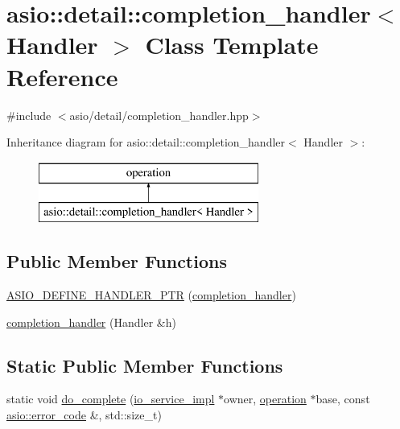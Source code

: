 \hypertarget{classasio_1_1detail_1_1completion__handler}{}\section{asio\+:\+:detail\+:\+:completion\+\_\+handler$<$ Handler $>$ Class Template Reference}
\label{classasio_1_1detail_1_1completion__handler}


{\ttfamily \#include $<$asio/detail/completion\+\_\+handler.\+hpp$>$}

Inheritance diagram for asio\+:\+:detail\+:\+:completion\+\_\+handler$<$ Handler $>$\+:\begin{figure}[H]
\begin{center}
\leavevmode
\includegraphics[height=2.000000cm]{classasio_1_1detail_1_1completion__handler}
\end{center}
\end{figure}
\subsection*{Public Member Functions}
\begin{DoxyCompactItemize}
\item 
\hyperlink{classasio_1_1detail_1_1completion__handler_aeb14b0bb16021feb3f1aa60e1bc9c59e}{A\+S\+I\+O\+\_\+\+D\+E\+F\+I\+N\+E\+\_\+\+H\+A\+N\+D\+L\+E\+R\+\_\+\+P\+T\+R} (\hyperlink{classasio_1_1detail_1_1completion__handler}{completion\+\_\+handler})
\item 
\hyperlink{classasio_1_1detail_1_1completion__handler_ad9252a0c07c63105bb8168382a048dc5}{completion\+\_\+handler} (Handler \&h)
\end{DoxyCompactItemize}
\subsection*{Static Public Member Functions}
\begin{DoxyCompactItemize}
\item 
static void \hyperlink{classasio_1_1detail_1_1completion__handler_a70f5ea2015e0bb3128b2eb30eab2897e}{do\+\_\+complete} (\hyperlink{namespaceasio_1_1detail_a6d61d9b8e53c11288be549d82aec5a42}{io\+\_\+service\+\_\+impl} $\ast$owner, \hyperlink{namespaceasio_1_1detail_a338968609bec20e37145309f8f9ec936}{operation} $\ast$base, const \hyperlink{classasio_1_1error__code}{asio\+::error\+\_\+code} \&, std\+::size\+\_\+t)
\end{DoxyCompactItemize}


